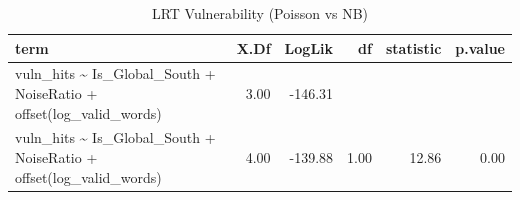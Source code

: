 \begin{table}[ht]
\centering
\begin{tabular}{lrrrrr}
  \hline
term & X.Df & LogLik & df & statistic & p.value \\ 
  \hline
vuln\_hits \~{} Is\_Global\_South + NoiseRatio + offset(log\_valid\_words) & 3.00 & -146.31 &  &  &  \\ 
  vuln\_hits \~{} Is\_Global\_South + NoiseRatio + offset(log\_valid\_words) & 4.00 & -139.88 & 1.00 & 12.86 & 0.00 \\ 
   \hline
\end{tabular}
\caption{LRT Vulnerability (Poisson vs NB)} 
\end{table}
